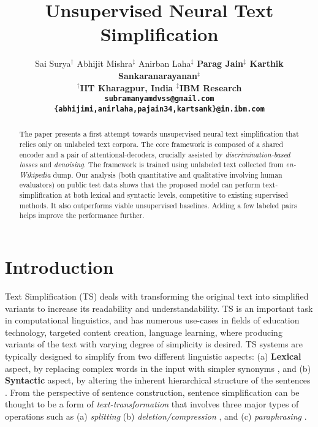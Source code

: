 \documentclass[11pt,a4paper]{article}
\title{Unsupervised Neural Text Simplification}
\author{Sai Surya$^{\dagger}$ \hspace{0.05cm} Abhijit Mishra$^{\ddagger}$ \hspace{0.05cm} Anirban Laha$^{\ddagger}$ \hspace{0.05cm} \bf{Parag Jain$^{\ddagger}$ \hspace{0.05cm} Karthik Sankaranarayanan}$^{\ddagger}$\\
  $^\dagger$IIT Kharagpur, India \hspace{0.1cm} 
  $^{\ddagger}$IBM Research\\
  {\tt subramanyamdvss@gmail.com} \\ {\tt \{abhijimi,anirlaha,pajain34,kartsank\}@in.ibm.com}
}
\date{}
\begin{document}
\maketitle
\begin{abstract}
The paper presents a first attempt towards unsupervised neural text simplification that relies only on unlabeled text corpora. The core framework is composed of a shared encoder and a pair of attentional-decoders, crucially assisted by \emph{discrimination-based losses} and \emph{denoising}. The framework is trained using unlabeled text collected from \textit{en-Wikipedia} dump. Our analysis (both quantitative and qualitative involving human evaluators) on public test data shows that the proposed model can perform text-simplification at both lexical and syntactic levels, competitive to existing supervised methods. It also outperforms viable unsupervised baselines. Adding a few labeled pairs helps improve the performance further. \end{abstract}

\section{Introduction}
\label{sec:intro}
Text Simplification (TS) deals with transforming the original text into simplified variants to increase its readability and understandability. TS is an important task in computational linguistics, and has numerous use-cases in fields of education technology, targeted content creation, language learning, where producing variants of the text with varying degree of simplicity is desired. TS systems are typically designed  to simplify from two different linguistic aspects: (a) \textbf{Lexical} aspect, by replacing complex words in the input with simpler synonyms \cite{devlin1998use,candido2009supporting,yatskar2010sake,biran2011putting,glavavs2015simplifying}, and  (b) \textbf{Syntactic} aspect, by altering the inherent hierarchical structure of the sentences \cite{chandrasekar1997automatic,canning1999syntactic,siddharthan2006syntactic,filippova2008dependency,brouwers2014syntactic}. From the perspective of sentence construction, sentence simplification can be thought to be a form of  \textit{text-transformation} that involves three major types of operations such as (a) \textit{splitting} \cite{siddharthan2006syntactic,petersen2007text,narayan2014hybrid} (b) \textit{deletion/compression} \cite{knight2002summarization,clarke2006models,filippova2008dependency,rush2015neural,filippova2015sentence}, and (c) \textit{paraphrasing}  \cite{specia2010translating,coster2011simple,wubben2012sentence,wang2016text,nisioi2017exploring}.
\end{document}
